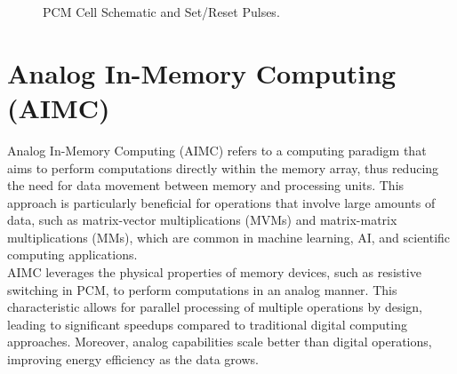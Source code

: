 \begin{figure}[H]
  \centering
  \hspace{1cm} 
  \caption{PCM Cell Schematic and Set/Reset Pulses.}
  \label{fig:PCM-cell-and-pulses}
\end{figure}

\section{Analog In-Memory Computing (AIMC)}\label{sec:aimc}
Analog In-Memory Computing (AIMC) refers to a computing paradigm that aims to perform computations directly within the memory array, thus reducing the need for data movement between memory and processing units.
This approach is particularly beneficial for operations that involve large amounts of data, such as matrix-vector multiplications (MVMs) 
and matrix-matrix multiplications (MMs), which are common in machine learning, AI, and scientific computing applications.\\
AIMC leverages the physical properties of memory devices, such as resistive switching in PCM, to perform computations in an analog manner.
This characteristic allows for parallel processing of multiple operations by design, leading to significant speedups compared to traditional digital computing approaches.
Moreover, analog capabilities scale better than digital operations, improving energy efficiency as the data grows.

